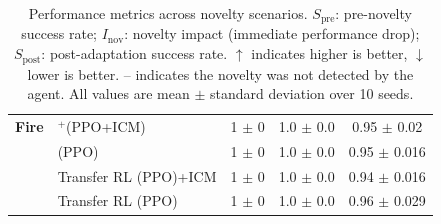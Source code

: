 \begin{table}[t]
\begin{tabular}{l l c c c}
\midrule
\textbf{Fire} & \RAPidLearn{}$^{+}$(PPO+ICM) & 1 $\pm$ 0 & 1.0 $\pm$ 0.0   & 0.95 $\pm$ 0.02 \\
              & \RAPidLearn{} (PPO)          & 1 $\pm$ 0 & 1.0 $\pm$ 0.0   & 0.95 $\pm$ 0.016 \\
              & Transfer RL (PPO)+ICM     & 1 $\pm$ 0 & 1.0 $\pm$ 0.0   & 0.94 $\pm$ 0.016 \\
              & Transfer RL (PPO)         & 1 $\pm$ 0 & 1.0 $\pm$ 0.0   & 0.96 $\pm$ 0.029 \\

\bottomrule
\end{tabular}
\caption[Performance metrics across novelty scenarios]{Performance metrics across novelty scenarios. $S_\text{pre}$: pre-novelty success rate; $I_\text{nov}$: novelty impact (immediate performance drop); $S_\text{post}$: post-adaptation success rate. $\uparrow$ indicates higher is better, $\downarrow$ lower is better. -- indicates the novelty was not detected by the agent. All values are mean $\pm$ standard deviation over 10 seeds.}
\label{tab:ng_performance}
\end{table}
